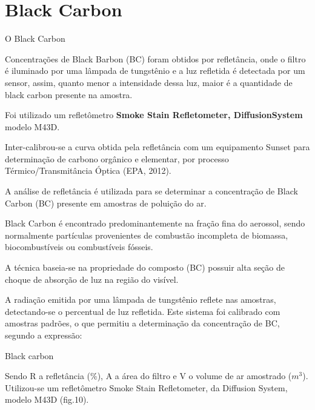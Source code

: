 \section{Black Carbon}

O Black Carbon 

Concentrações de Black Barbon (BC) foram obtidos por  refletância, 
onde o filtro é iluminado por uma lâmpada de tungstênio e a luz refletida é 
detectada por um sensor, assim, quanto menor a intensidade dessa luz,
 maior é a quantidade de black carbon presente na amostra. 

Foi utilizado um refletômetro 
\textbf{Smoke Stain Refletometer, DiffusionSystem} modelo M43D. 

Inter-calibrou-se a curva obtida pela refletância com um equipamento 
Sunset para determinação de carbono orgânico e elementar, 
por processo Térmico/Transmitância Óptica (EPA, 2012).

A análise de refletância  é utilizada para se determinar a concentração 
de Black Carbon (BC) presente em amostras de poluição do ar. 

Black Carbon é encontrado  predominantemente na fração fina do aerossol, 
sendo normalmente partículas provenientes de combustão incompleta de biomassa, 
biocombustíveis ou combustíveis fósseis. 

A técnica baseia-se na propriedade do composto (BC) possuir alta seção de 
choque de absorção de luz na região do visível. 

A radiação emitida por uma lâmpada de tungstênio reflete nas amostras, 
detectando-se o percentual de luz refletida. Este sistema foi calibrado 
com amostras padrões, o que permitiu a determinação da concentração de BC, 
segundo a expressão:

Black carbon 

Sendo R a refletância (\%), A a área do filtro e V o volume de ar amostrado ($m^3$). 
Utilizou-se um refletômetro Smoke Stain Refletometer, da Diffusion System, modelo M43D (fig.10).

